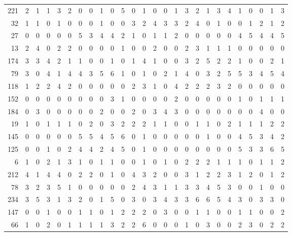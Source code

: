 \begin{longtable}{@{\extracolsep{\fill}}rccccccccccccccccccccccccc@{}}
221 & 2 & 1 & 1 & 3 & 2 & 0 & 0 & 1 & 0 & 5 & 0 & 1 & 0 & 0 & 1 & 3 & 2 & 1 & 3 & 4 & 1 & 0 & 0 & 1 & 3 \\
32 & 1 & 1 & 0 & 1 & 0 & 0 & 0 & 1 & 0 & 0 & 3 & 2 & 4 & 3 & 3 & 2 & 4 & 0 & 1 & 0 & 0 & 1 & 2 & 1 & 2 \\
27 & 0 & 0 & 0 & 0 & 0 & 5 & 3 & 4 & 4 & 2 & 1 & 0 & 1 & 1 & 2 & 0 & 0 & 0 & 0 & 0 & 4 & 5 & 4 & 4 & 5 \\
13 & 2 & 4 & 0 & 2 & 2 & 0 & 0 & 0 & 0 & 1 & 0 & 0 & 2 & 0 & 0 & 2 & 3 & 1 & 1 & 1 & 0 & 0 & 0 & 0 & 0 \\
174 & 3 & 3 & 4 & 2 & 1 & 1 & 0 & 0 & 1 & 0 & 1 & 4 & 1 & 0 & 0 & 3 & 2 & 5 & 2 & 2 & 1 & 0 & 0 & 2 & 1 \\
79 & 3 & 0 & 4 & 1 & 4 & 4 & 3 & 5 & 6 & 1 & 0 & 1 & 0 & 2 & 1 & 4 & 0 & 3 & 2 & 5 & 5 & 3 & 4 & 5 & 4 \\
118 & 1 & 2 & 2 & 4 & 2 & 0 & 0 & 0 & 0 & 0 & 2 & 3 & 1 & 0 & 4 & 2 & 2 & 2 & 3 & 2 & 0 & 0 & 0 & 0 & 0 \\
152 & 0 & 0 & 0 & 0 & 0 & 0 & 0 & 0 & 3 & 1 & 0 & 0 & 0 & 0 & 2 & 0 & 0 & 0 & 0 & 0 & 1 & 0 & 1 & 1 & 1 \\
184 & 0 & 3 & 0 & 0 & 0 & 0 & 0 & 2 & 0 & 0 & 2 & 0 & 3 & 4 & 3 & 0 & 0 & 0 & 0 & 0 & 0 & 0 & 4 & 0 & 0 \\
19 & 1 & 0 & 1 & 1 & 1 & 0 & 2 & 0 & 3 & 2 & 2 & 2 & 1 & 1 & 0 & 0 & 1 & 1 & 0 & 2 & 1 & 1 & 1 & 2 & 2 \\
145 & 0 & 0 & 0 & 0 & 0 & 5 & 5 & 4 & 5 & 6 & 0 & 1 & 0 & 0 & 0 & 0 & 0 & 1 & 0 & 0 & 4 & 5 & 3 & 4 & 2 \\
125 & 0 & 0 & 1 & 0 & 2 & 4 & 4 & 2 & 4 & 5 & 0 & 1 & 0 & 0 & 0 & 0 & 0 & 0 & 0 & 0 & 5 & 3 & 3 & 6 & 5 \\
6 & 1 & 0 & 2 & 1 & 3 & 1 & 0 & 1 & 1 & 0 & 0 & 1 & 0 & 1 & 0 & 2 & 2 & 2 & 1 & 1 & 1 & 0 & 1 & 1 & 2 \\
212 & 4 & 1 & 4 & 4 & 0 & 2 & 2 & 0 & 1 & 0 & 4 & 3 & 2 & 0 & 0 & 3 & 1 & 2 & 2 & 3 & 1 & 2 & 0 & 1 & 2 \\
78 & 3 & 2 & 3 & 5 & 1 & 0 & 0 & 0 & 0 & 0 & 2 & 4 & 3 & 1 & 1 & 3 & 3 & 4 & 5 & 3 & 0 & 0 & 1 & 0 & 0 \\
234 & 3 & 5 & 3 & 1 & 3 & 2 & 0 & 1 & 5 & 0 & 3 & 0 & 3 & 4 & 3 & 3 & 6 & 6 & 5 & 4 & 3 & 0 & 3 & 3 & 0 \\
147 & 0 & 0 & 1 & 0 & 0 & 1 & 1 & 0 & 1 & 2 & 2 & 2 & 0 & 3 & 0 & 0 & 1 & 1 & 0 & 0 & 1 & 1 & 0 & 0 & 2 \\
66 & 1 & 0 & 2 & 0 & 1 & 1 & 1 & 1 & 3 & 2 & 2 & 6 & 0 & 0 & 0 & 1 & 0 & 3 & 0 & 0 & 2 & 3 & 0 & 2 & 2 \\

\end{longtable}

